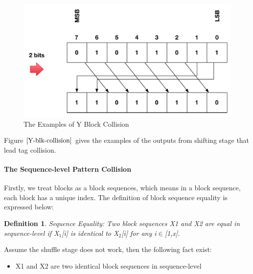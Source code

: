 \documentclass{article}
\newtheorem{defination}{Definition}[section]
\begin{document}
\begin{figure}
{\begin{minipage}[b]{0.45\textwidth}
\includegraphics[width=1\textwidth]{./diagrams/r_d_2bits.pdf}
\end{minipage}
}
 \caption{The Examples of Y Block Collision}
 \label{fig: Y-blk-collision}
\end{figure}
Figure $\ref{Y-blk-collision}$ gives the examples of the outputs from shifting stage that lead tag collision.

\paragraph{The Sequence-level Pattern Collision}
Firstly, we treat blocks as a block sequences, which means in a block sequence, each block has a unique index. The definition of block sequence equality is expressed below:
\begin{defination}
Sequence Equality: Two block sequences X1 and X2 are equal in sequence-level if X$_1$[i] is identical to X$_2$[i] for any i$\in$[1,x].
\end{defination}

Assume the shuffle stage does not work, then the following fact exist:
\begin{itemize}
	\item X1 and X2 are two identical block sequences in sequence-level
\end{itemize}
\end{document}
